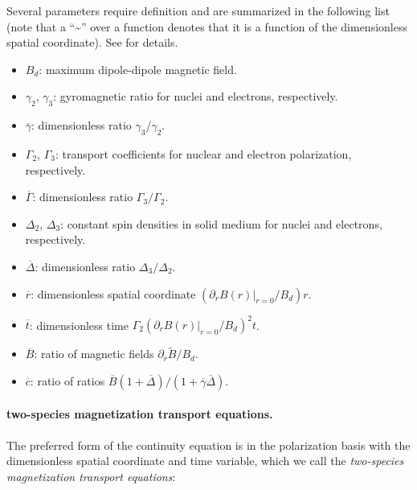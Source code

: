 \documentclass[%
oneside,                 %
final,                   %
10pt]{article}
\begin{document}
\noindent
Several parameters require definition and are summarized in the following list (note that a ``\textasciitilde{}'' over a function denotes that it is a function of the dimensionless spatial coordinate). 
See \cite{Picone2014b} for details.

\begin{itemize}
\item $B_d$: maximum dipole-dipole magnetic field.

\item $\gamma_2$, $\gamma_3$: gyromagnetic ratio for nuclei and electrons, respectively.

\item $\overline{\gamma}$: dimensionless ratio $\gamma_3/\gamma_2$.

\item $\Gamma_2$, $\Gamma_3$: transport coefficients for nuclear and electron polarization, respectively.

\item $\overline{\Gamma}$: dimensionless ratio $\Gamma_3/\Gamma_2$.

\item $\Delta_2$, $\Delta_3$: constant spin densities in solid medium for nuclei and electrons, respectively.

\item $\overline{\Delta}$: dimensionless ratio $\Delta_3/\Delta_2$.

\item $\overline{r}$: dimensionless spatial coordinate $(\partial_r B(r)|_{r=0}/B_d) r$.

\item $\overline{t}$: dimensionless time $\Gamma_2 (\partial_r B(r)|_{r=0}/B_d)^2 t$.

\item $\overline{B}$: ratio of magnetic fields $\partial_{\overline{r}} \tilde{B}/B_d$.

\item $\overline{c}$: ratio of ratios $\overline{B} (1+\overline{\Delta})/(1+\overline{\gamma}\overline{\Delta})$.
\end{itemize}

\noindent
\paragraph{two-species magnetization transport equations.}
The preferred form of the continuity equation is in the polarization basis with the dimensionless spatial coordinate and time variable, which we call the \emph{two-species magnetization transport equations}:
\end{document}
